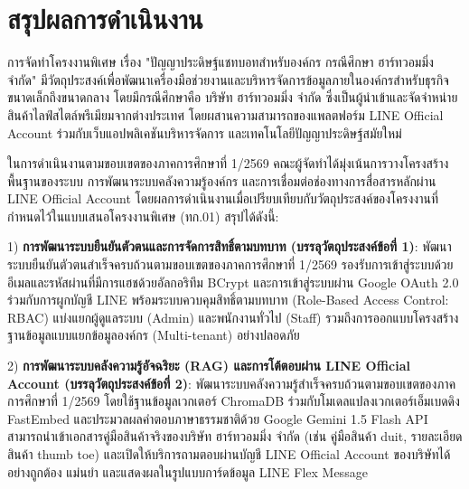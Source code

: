 \vspace{0.2in}

\section{สรุปผลการดำเนินงาน}
\hspace*{1.3em}
การจัดทำโครงงานพิเศษ เรื่อง "ปัญญาประดิษฐ์แชทบอทสำหรับองค์กร กรณีศึกษา ฮาร์ทวอมมิ่ง จำกัด" มีวัตถุประสงค์เพื่อพัฒนาเครื่องมือช่วยงานและบริหารจัดการข้อมูลภายในองค์กรสำหรับธุรกิจขนาดเล็กถึงขนาดกลาง โดยมีกรณีศึกษาคือ บริษัท ฮาร์ทวอมมิ่ง จำกัด ซึ่งเป็นผู้นำเข้าและจัดจำหน่ายสินค้าไลฟ์สไตล์พรีเมียมจากต่างประเทศ โดยผสานความสามารถของแพลตฟอร์ม LINE Official Account ร่วมกับเว็บแอปพลิเคชันบริหารจัดการ และเทคโนโลยีปัญญาประดิษฐ์สมัยใหม่

\hspace*{1.3em}
ในการดำเนินงานตามขอบเขตของภาคการศึกษาที่ 1/2569 คณะผู้จัดทำได้มุ่งเน้นการวางโครงสร้างพื้นฐานของระบบ การพัฒนาระบบคลังความรู้องค์กร และการเชื่อมต่อช่องทางการสื่อสารหลักผ่าน LINE Official Account โดยผลการดำเนินงานเมื่อเปรียบเทียบกับวัตถุประสงค์ของโครงงานที่กำหนดไว้ในแบบเสนอโครงงานพิเศษ (ทก.01) สรุปได้ดังนี้:

\begin{mycustomitem}
\item 1) \textbf{การพัฒนาระบบยืนยันตัวตนและการจัดการสิทธิ์ตามบทบาท (บรรลุวัตถุประสงค์ข้อที่ 1)}: พัฒนาระบบยืนยันตัวตนสำเร็จครบถ้วนตามขอบเขตของภาคการศึกษาที่ 1/2569 รองรับการเข้าสู่ระบบด้วยอีเมลและรหัสผ่านที่มีการแฮชด้วยอัลกอริทึม BCrypt และการเข้าสู่ระบบผ่าน Google OAuth 2.0 ร่วมกับการผูกบัญชี LINE พร้อมระบบควบคุมสิทธิ์ตามบทบาท (Role-Based Access Control: RBAC) แบ่งแยกผู้ดูแลระบบ (Admin) และพนักงานทั่วไป (Staff) รวมถึงการออกแบบโครงสร้างฐานข้อมูลแบบแยกข้อมูลองค์กร (Multi-tenant) อย่างปลอดภัย
\end{mycustomitem}

\begin{mycustomitem}
\item 2) \textbf{การพัฒนาระบบคลังความรู้อัจฉริยะ (RAG) และการโต้ตอบผ่าน LINE Official Account (บรรลุวัตถุประสงค์ข้อที่ 2)}: พัฒนาระบบคลังความรู้สำเร็จครบถ้วนตามขอบเขตของภาคการศึกษาที่ 1/2569 โดยใช้ฐานข้อมูลเวกเตอร์ ChromaDB ร่วมกับโมเดลแปลงเวกเตอร์เอ็มเบดดิง FastEmbed และประมวลผลคำตอบภาษาธรรมชาติด้วย Google Gemini 1.5 Flash API สามารถนำเข้าเอกสารคู่มือสินค้าจริงของบริษัท ฮาร์ทวอมมิ่ง จำกัด (เช่น คู่มือสินค้า duit, รายละเอียดสินค้า thumb toe) และเปิดให้บริการถามตอบผ่านบัญชี LINE Official Account ของบริษัทได้อย่างถูกต้อง แม่นยำ และแสดงผลในรูปแบบการ์ดข้อมูล LINE Flex Message
\end{mycustomitem}

